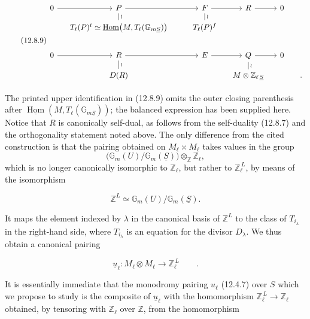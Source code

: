 \begin{equation}\tag{12.8.9}
\begin{tikzcd}[row sep=small,column sep=small]
0 \arrow[r] & P \arrow[rr] \arrow[d,dash,"\wr"]
 & & F \arrow[r] \arrow[d,dash,"\wr"] & R \arrow[r] & 0 & \\
& T_\ell(P)^t\simeq
  \underline{\operatorname{Hom}}
    \bigl(M,T_\ell(\mathbb G_{m\underline S})\bigr)
& & T_\ell(P)^f & & & \\
& & & & & & \\
0 \arrow[r] & R \arrow[rr] \arrow[d,dash,"\wr"]
& & E \arrow[r] & Q \arrow[r] \arrow[d,dash,"\wr"] & 0 & \\
& D(R) & & & M\otimes\mathbb Z_{\ell\,\underline S} & & .
\end{tikzcd}
\end{equation}

\noindent
The printed upper identification in (12.8.9) omits the outer closing
parenthesis after
$\underline{\operatorname{Hom}}(M,T_\ell(\mathbb G_{m\underline S}))$;
the balanced expression has been supplied here. Notice that $R$ is
canonically self-dual, as follows from the self-duality (12.8.7) and the
orthogonality statement noted above. The only difference from the cited
construction is that the pairing obtained on $M_\ell\times M_\ell$ takes
values in the group
\[
 \bigl(\mathbb G_m(U)/\mathbb G_m(\underline S)\bigr)
 \otimes_{\mathbb Z}\mathbb Z_\ell,
\]
which is no longer canonically isomorphic to $\mathbb Z_\ell$, but rather
to $\mathbb Z_\ell^{\,L}$, by means of the isomorphism

\begin{equation}\tag{12.8.10}
 \mathbb Z^L\simeq
 \mathbb G_m(U)/\mathbb G_m(\underline S).
\end{equation}

\noindent
It maps the element indexed by $\lambda$ in the canonical basis of
$\mathbb Z^L$ to the class of $T_{i_\lambda}$ in the right-hand side,
where $T_{i_\lambda}$ is an equation for the divisor $D_\lambda$. We thus
obtain a canonical pairing

\begin{equation}\tag{12.8.11}
 \underline{u}_\ell:M_\ell\otimes M_\ell
 \longrightarrow\mathbb Z_\ell^{\,L}\qquad .
\end{equation}

\noindent
It is essentially immediate that the monodromy pairing $u_\ell$ (12.4.7)
over $S$ which we propose to study is the composite of
$\underline{u}_\ell$ with the homomorphism
$\mathbb Z_\ell^{\,L}\longrightarrow\mathbb Z_\ell$ obtained, by
tensoring with $\mathbb Z_\ell$ over $\mathbb Z$, from the homomorphism

